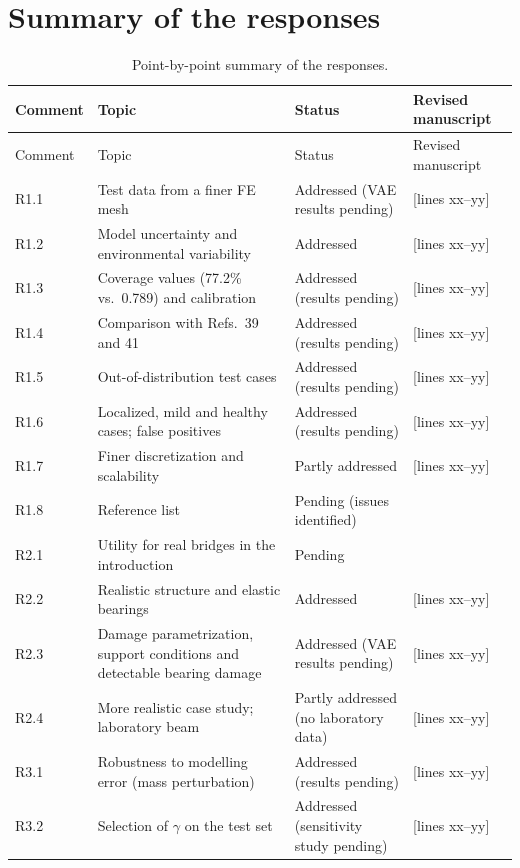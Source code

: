 \documentclass[11pt]{article}
\newcommand{\tbd}[1]{\textcolor{note}{\textsf{[#1]}}}
\newcommand{\lines}[1]{\tbd{lines #1}}
\begin{document}
\section{Summary of the responses}
{\small
\begin{longtable}{p{1.55cm}p{6.0cm}p{3.0cm}p{3.6cm}}
\caption{Point-by-point summary of the responses.}\label{tab:summary}\\
\toprule
Comment & Topic & Status & Revised manuscript \\
\midrule
\endfirsthead
\toprule
Comment & Topic & Status & Revised manuscript \\
\midrule
\endhead
R1.1 & Test data from a finer FE mesh & Addressed (VAE results pending) & \lines{xx--yy} \\
R1.2 & Model uncertainty and environmental variability & Addressed & \lines{xx--yy} \\
R1.3 & Coverage values (77.2\% vs.\ 0.789) and calibration & Addressed (results pending) & \lines{xx--yy} \\
R1.4 & Comparison with Refs.\ 39 and 41 & Addressed (results pending) & \lines{xx--yy} \\
R1.5 & Out-of-distribution test cases & Addressed (results pending) & \lines{xx--yy} \\
R1.6 & Localized, mild and healthy cases; false positives & Addressed (results pending) & \lines{xx--yy} \\
R1.7 & Finer discretization and scalability & Partly addressed & \lines{xx--yy} \\
R1.8 & Reference list & Pending (issues identified) & \\
R2.1 & Utility for real bridges in the introduction & Pending & \\
R2.2 & Realistic structure and elastic bearings & Addressed & \lines{xx--yy} \\
R2.3 & Damage parametrization, support conditions and detectable bearing damage & Addressed (VAE results pending) & \lines{xx--yy} \\
R2.4 & More realistic case study; laboratory beam & Partly addressed (no laboratory data) & \lines{xx--yy} \\
R3.1 & Robustness to modelling error (mass perturbation) & Addressed (results pending) & \lines{xx--yy} \\
R3.2 & Selection of $\gamma$ on the test set & Addressed (sensitivity study pending) & \lines{xx--yy} \\

\end{longtable}}
\end{document}
